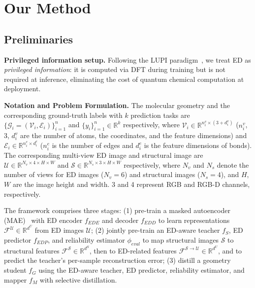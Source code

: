 \section{Our Method}
\label{sec:OurMethod}

\subsection{Preliminaries}

\textbf{Privileged information setup.} Following the LUPI paradigm~\cite{vapnik2009new,lopez2016unifying}, we treat ED as \emph{privileged information}: it is computed via DFT during training but is not required at inference, eliminating the cost of quantum chemical computation at deployment.

\textbf{Notation and Problem Formulation.} The molecular geometry and the corresponding ground-truth labels with $k$ prediction tasks are $\{\mathcal{G}_i=(\mathcal{V}_i, \mathcal{E}_i)\}_{i=1}^n$ and $\{y_i\}_{i=1}^n\in\mathbb{R}^k$ respectively, where $\mathcal{V}_i\in\mathbb{R}^{n^v_i\times(3+d_i^v)}$ ($n^v_i$, 3, $d_i^v$ are the number of atoms, the coordinates, and the feature dimensions) and $\mathcal{E}_i\in\mathbb{R}^{n^e_i\times d_i^e}$ ($n^e_i$ is the number of edges and $d_i^e$ is the feature dimensions of bonds). The corresponding multi-view ED image and structural image are $\mathcal{U}\in\mathbb{R}^{N_v\times 4\times H\times W}$ and $\mathcal{S}\in\mathbb{R}^{N_s\times 3\times H\times W}$ respectively, where $N_v$ and $N_s$ denote the number of views for ED images ($N_v\!=\!6$) and structural images ($N_s\!=\!4$), and $H$, $W$ are the image height and width. 3 and 4 represent RGB and RGB-D channels, respectively.

The framework comprises three stages: (1) pre-train a masked autoencoder (MAE)~\cite{he2022masked} with ED encoder $f_{EDE}$ and decoder $f_{EDD}$ to learn representations $\mathcal{F}^{\mathcal{U}}\in\mathbb{R}^{d^U}$ from ED images $\mathcal{U}$; (2) jointly pre-train an ED-aware teacher $f_{S}$, ED predictor $f_{EDP}$, and reliability estimator $\phi_{eval}$ to map structural images $\mathcal{S}$ to structural features $\mathcal{F}^{\mathcal{S}}\in\mathbb{R}^{d^{S}}$, then to ED-related features $\mathcal{F}^{\mathcal{S}\rightarrow\mathcal{U}}\in\mathbb{R}^{d^U}$, and to predict the teacher's per-sample reconstruction error; (3) distill a geometry student $f_{G}$ using the ED-aware teacher, ED predictor, reliability estimator, and mapper $f_M$ with selective distillation.

